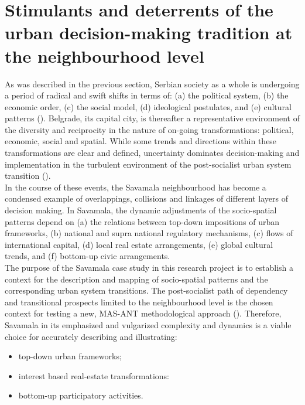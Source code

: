 \documentclass[11pt]{report}
\begin{document}
{{{{\section{Stimulants and deterrents of the urban decision-making tradition at the neighbourhood level}

As was described in the previous section, Serbian society as a whole is undergoing a period of radical and swift shifts in terms of:  (a) the political system, (b) the economic order,
(c)	the social model, (d) ideological postulates, and (e) cultural patterns  (\href{Petrovic}{\citealt{petrovic_cities_2009}}).
Belgrade, its capital city, is thereafter a representative environment of the diversity and reciprocity in the nature of on-going transformations: political, economic, social and spatial. While some trends and directions within these transformations are clear and defined, uncertainty dominates decision-making and implementation in the turbulent environment of the post-socialist urban system transition (\href{Nedovic}{\citealt{nedovic-budic_adjustment_2001}}).
\\

In the course of these events, the Savamala neighbourhood has become a condensed example of overlappings, collisions and linkages of different layers of decision making.
In Savamala, the dynamic adjustments of the socio-spatial patterns depend on
(a) the relations between top-down impositions of urban frameworks, (b) national and supra national regulatory mechanisms,
(c) flows of international capital,
(d) local real estate arrangements,
(e) global cultural trends, and
(f) bottom-up civic arrangements.
\\

The purpose of the Savamala case study in this research project is to establish a context for the description and mapping of socio-spatial patterns and the corresponding urban system transitions. The post-socialist path of dependency and transitional prospects limited to the neighbourhood level is the chosen context for testing a new, MAS-ANT methodological approach (\href{Yin}{\citealt{yin_case_2009}}).
Therefore, Savamala in its emphasized and vulgarized complexity and dynamics is a viable choice for accurately describing and illustrating:
\begin{itemize}
\item top-down urban frameworks;
\item interest based real-estate transformations:
\item bottom-up participatory activities.
\end{itemize}

}}}}
\end{document}
